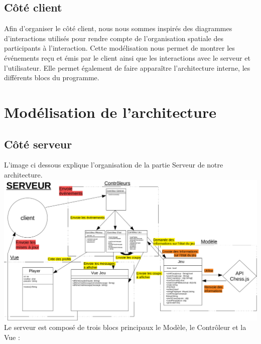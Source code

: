 \documentclass[12pt, openany]{report}
\begin{document}
\subsection{Côté client}
Afin d'organiser le côté client, nous nous sommes inspirés des diagrammes d'interactions utilisés pour rendre compte de l'organisation spatiale des participants à l'interaction. Cette modélisation nous permet de montrer les événements reçu et émis par le client ainsi que les interactions avec le serveur et l'utilisateur. Elle permet également de faire apparaître l'architecture interne, les différents blocs du programme.

\section{Modélisation de l'architecture}
\subsection{Côté serveur}
L'image ci dessous explique l'organisation de la partie Serveur de notre architecture.\newline
 \includegraphics[width=16cm]{Serveur.png}  
Le serveur est composé de trois blocs principaux le Modèle, le Contrôleur et la Vue :
\end{document}
